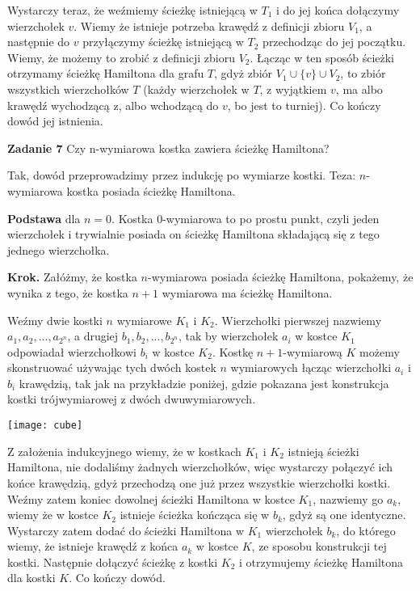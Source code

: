 \documentclass[12pt,a4paper]{article}
\begin{document}
Wystarczy teraz, że weźmiemy ścieżkę istniejącą w \(T_1\) i do jej końca dołączymy wierzchołek \(v\). Wiemy że istnieje potrzeba krawędź z definicji zbioru \(V_1\), a następnie do \(v\) przyłączymy ścieżkę istniejącą w \(T_2\) przechodząc do jej początku. Wiemy, że możemy to zrobić z definicji zbioru \(V_2\). Łącząc w ten sposób ścieżki otrzymamy ścieżkę Hamiltona dla grafu \(T\), gdyż zbiór \(V_1 \cup \{v\} \cup V_2\), to zbiór wszystkich wierzchołków \(T\) (każdy wierzchołek w \(T\), z wyjątkiem \(v\), ma albo krawędź wychodzącą z, albo wchodzącą do \(v\), bo jest to turniej). Co kończy dowód jej istnienia.

\vskip 0.5cm
\noindent
\textbf{Zadanie 7} Czy n-wymiarowa kostka zawiera ścieżkę Hamiltona? 
\vskip 0.2cm

Tak, dowód przeprowadzimy przez indukcję po wymiarze kostki. Teza: \(n\)-wymiarowa kostka posiada ścieżkę Hamiltona.

\textbf{Podstawa} dla \(n=0\). Kostka \(0\)-wymiarowa to po prostu punkt, czyli jeden wierzchołek i trywialnie posiada on ścieżkę Hamiltona składającą się z tego jednego wierzchołka.

\textbf{Krok.} Załóżmy, że kostka \(n\)-wymiarowa posiada ścieżkę Hamiltona, pokażemy, że wynika z tego, że kostka \(n+1\) wymiarowa ma ścieżkę Hamiltona.

Weźmy dwie kostki \(n\) wymiarowe \(K_1\) i \(K_2\). Wierzchołki pierwszej nazwiemy \(a_1, a_2, ..., a_{2^n}\), a drugiej \(b_1, b_2, ..., b_{2^n}\), tak by wierzchołek \(a_i\) w kostce \(K_1\) odpowiadał wierzchołkowi \(b_i\) w kostce \(K_2\). Kostkę \(n+1\)-wymiarową \(K\) możemy skonstruować używając tych dwóch kostek \(n\) wymiarowych łącząc wierzchołki \(a_i\) i \(b_i\) krawędzią, tak jak na przykładzie poniżej, gdzie pokazana jest konstrukcja kostki trójwymiarowej z dwóch dwuwymiarowych.

\begin{center}
	\texttt{[image: cube]} 
\end{center}

Z założenia indukcyjnego wiemy, że w kostkach \(K_1\) i \(K_2\) istnieją ścieżki Hamiltona, nie dodaliśmy żadnych wierzchołków, więc wystarczy połączyć ich końce krawędzią, gdyż przechodzą one już przez wszystkie wierzchołki kostki. Weźmy zatem koniec dowolnej ścieżki Hamiltona w kostce \(K_1\), nazwiemy go \(a_k\), wiemy że w kostce \(K_2\) istnieje ścieżka kończąca się w \(b_k\), gdyż są one identyczne. Wystarczy zatem dodać do ścieżki Hamiltona w \(K_1\) wierzchołek \(b_k\), do którego wiemy, że istnieje krawędź z końca \(a_k\) w kostce \(K\), ze sposobu konstrukcji tej kostki. Następnie dołączyć ścieżkę z kostki \(K_2\) i otrzymujemy ścieżkę Hamiltona dla kostki \(K\). Co kończy dowód.
\end{document}
